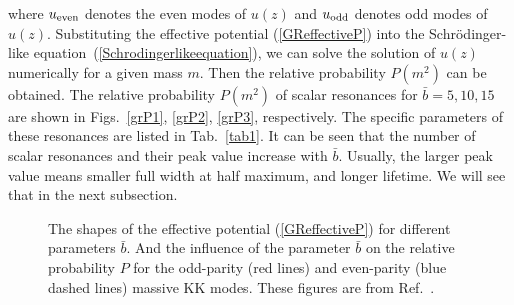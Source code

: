 where $u_{\rm{even}}$ denotes the even modes of $u(z)$ and $u_{\rm{odd}}$ denotes odd modes of $u(z)$. Substituting the effective potential (\ref{GReffectiveP}) into the Schr\"odinger-like equation~(\ref{Schrodingerlikeequation}), we can solve the solution of $u(z)$ numerically for a given mass $m$. Then the relative probability $P(m^2)$ can be obtained. The relative probability $P(m^2)$ of scalar resonances for $\bar{b}=5,10,15$ are shown in Figs.~\ref{grP1}, \ref{grP2}, \ref{grP3}, respectively. The specific parameters of these resonances are listed in Tab.~\ref{tab1}. It can be seen that the number of scalar resonances and their peak value increase with $\bar{b}$. Usually, the larger peak value means smaller full width at half maximum, and longer lifetime. We will see that in the next subsection.
 \begin{figure*}
 \centering
{}
\caption{The shapes of the effective potential (\ref{GReffectiveP}) for different parameters $\bar{b}$. And the influence of the parameter $\bar{b}$ on the relative probability $P$ for the odd-parity (red lines) and even-parity (blue dashed lines) massive KK modes. These figures are from Ref.~\cite{Tan:2020sys}.}\label{model1P}
\end{figure*}


